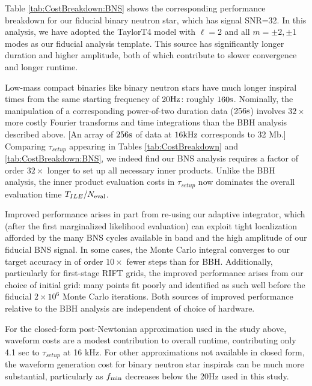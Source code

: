 \documentclass[twocolumn,prd,nofootinbib]{revtex4}
\newcommand\unit[1]{{\rm #1}}
\begin{document}
Table \ref{tab:CostBreakdown:BNS} shows the corresponding performance breakdown for our fiducial binary neutron star,
which has signal SNR=32.  In this analysis, we have adopted the TaylorT4 model with $\ell=2$ and all $m=\pm 2,\pm 1$ modes as our
fiducial analysis template.   This source has significantly longer duration and higher amplitude, both of which contribute to slower convergence and longer runtime. 

Low-mass compact binaries like binary neutron stars have much longer inspiral times from the same starting frequency of
$20\unit{Hz}$: roughly $160 \unit{s}$.   Nominally, the manipulation of a corresponding power-of-two duration data ($256\unit{s}$) involves
$32\times$ more costly Fourier transforms and time integrations than the BBH analysis described above.  
[An array of $256\unit{s}$ of data at $16\unit{kHz}$ corresponds to  32 Mb.]  Comparing $\tau_{setup}$ appearing in Tables
 \ref{tab:CostBreakdown} and  \ref{tab:CostBreakdown:BNS}, we indeed find our BNS analysis requires  a factor of order   $32\times$
 longer to set up all necessary inner products.  Unlike the BBH analysis, the inner product evaluation costs in
 $\tau_{setup}$ now dominates the
 overall evaluation time $T_{ILE}/N_{\rm eval}$. 


Improved performance arises in part from re-using our adaptive integrator, which (after the first marginalized
likelihood evaluation) can exploit tight localization afforded by the many BNS cycles available in band and the high
amplitude of our fiducial BNS signal.   In some cases, the Monte Carlo integral converges to our target accuracy in of order $10\times $ fewer steps than for BBH.  
Additionally, particularly for first-stage RIFT grids, the improved performance arises from our choice of initial grid: many points fit poorly and identified as such well before the fiducial $2\times 10^6$ Monte Carlo iterations.  
Both sources of improved performance relative to the BBH analysis are independent of choice of hardware.




For the closed-form post-Newtonian approximation used in the study above, waveform costs are a modest contribution to
overall runtime, contributing only 4.1 sec to $\tau_{setup}$ at 16 kHz.
For other approximations not available in closed form, the waveform generation cost for binary neutron star inspirals
can be much more substantial, particularly as $f_{\rm min}$ decreases below the 20\unit{Hz} used in this study.  
\end{document}
